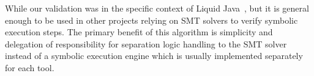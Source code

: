\documentclass[sigplan,screen,review]{acmart}
\begin{document}
While our validation was in the specific context of Liquid Java~\cite{gamboa2021user}, but it is general enough to be used in other projects relying on SMT solvers to verify symbolic execution steps. The primary benefit of this algorithm is simplicity and delegation of responsibility for separation logic handling to the SMT solver instead of a symbolic execution engine which is usually implemented separately for each tool. 




\end{document}
